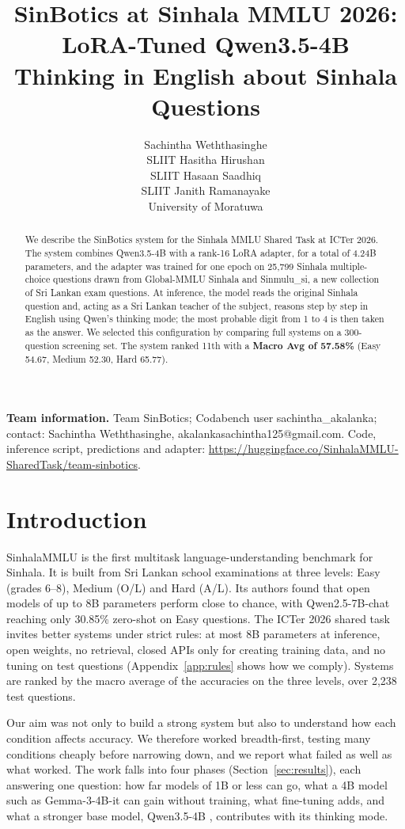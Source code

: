 \documentclass[11pt]{article}
\title{SinBotics at Sinhala MMLU 2026: LoRA-Tuned Qwen3.5-4B\\Thinking in English about Sinhala Questions}
\author{Sachintha Weththasinghe \\ SLIIT \And
  Hasitha Hirushan \\ SLIIT \And
  Hasaan Saadhiq \\ SLIIT \And
  Janith Ramanayake \\ University of Moratuwa}
\newcommand{\sinmulu}{Sinmulu\_si}
\begin{document}
\maketitle

\begin{abstract}
We describe the SinBotics system for the Sinhala MMLU Shared Task at ICTer 2026. The system combines Qwen3.5-4B with a rank-16 LoRA adapter, for a total of 4.24B parameters, and the adapter was trained for one epoch on 25,799 Sinhala multiple-choice questions drawn from Global-MMLU Sinhala and \sinmulu{}, a new collection of Sri Lankan exam questions. At inference, the model reads the original Sinhala question and, acting as a Sri Lankan teacher of the subject, reasons step by step in English using Qwen's thinking mode; the most probable digit from 1 to 4 is then taken as the answer. We selected this configuration by comparing full systems on a 300-question screening set. The system ranked 11th with a \textbf{Macro Avg of 57.58\%} (Easy 54.67, Medium 52.30, Hard 65.77).
\end{abstract}

{\small\noindent\textbf{Team information.} Team SinBotics; Codabench user sachintha\_akalanka; contact: Sachintha Weththasinghe, akalankasachintha125@gmail.com. Code, inference script, predictions and adapter: \url{https://huggingface.co/SinhalaMMLU-SharedTask/team-sinbotics}.\par}

\section{Introduction}
SinhalaMMLU \citep{pramodya2025sinhalammlu} is the first multitask language-understanding benchmark for Sinhala. It is built from Sri Lankan school examinations at three levels: Easy (grades 6--8), Medium (O/L) and Hard (A/L). Its authors found that open models of up to 8B parameters perform close to chance, with Qwen2.5-7B-chat reaching only 30.85\% zero-shot on Easy questions. The ICTer 2026 shared task invites better systems under strict rules: at most 8B parameters at inference, open weights, no retrieval, closed APIs only for creating training data, and no tuning on test questions (Appendix~\ref{app:rules} shows how we comply). Systems are ranked by the macro average of the accuracies on the three levels, over 2,238 test questions.

Our aim was not only to build a strong system but also to understand how each condition affects accuracy. We therefore worked breadth-first, testing many conditions cheaply before narrowing down, and we report what failed as well as what worked. The work falls into four phases (Section~\ref{sec:results}), each answering one question: how far models of 1B or less can go, what a 4B model such as Gemma-3-4B-it \citep{gemma2025} can gain without training, what fine-tuning adds, and what a stronger base model, Qwen3.5-4B \citep{qwen2026}, contributes with its thinking mode.
\end{document}
